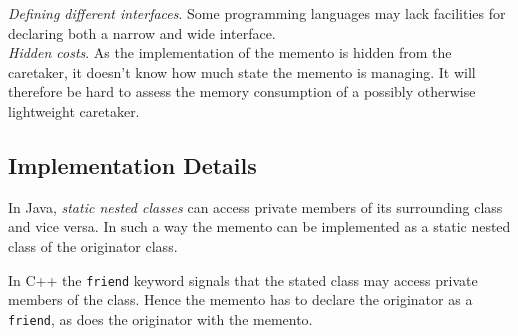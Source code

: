 \documentclass[11pt, a4paper, twoside]{article}
\begin{document}
	\noindent\emph{Defining different interfaces}. Some programming languages may lack facilities for declaring both a narrow and wide interface. \\
	
	\noindent\emph{Hidden costs}. As the implementation of the memento is hidden from the caretaker, it doesn't know how much state the memento is managing. It will therefore be hard to assess the memory consumption of a possibly otherwise lightweight caretaker.
	
	\subsection{Implementation Details}
	\label{sec:impl}
	In Java, \emph{static nested classes} can access private members of its surrounding class and vice versa. In such a way the memento can be implemented as a static nested class of the originator class.
	
	In C++ the \verb|friend| keyword signals that the stated class may access private members of the class. Hence the memento has to declare the originator as a \verb|friend|, as does the originator with the memento.
	
	
	
\end{document}
